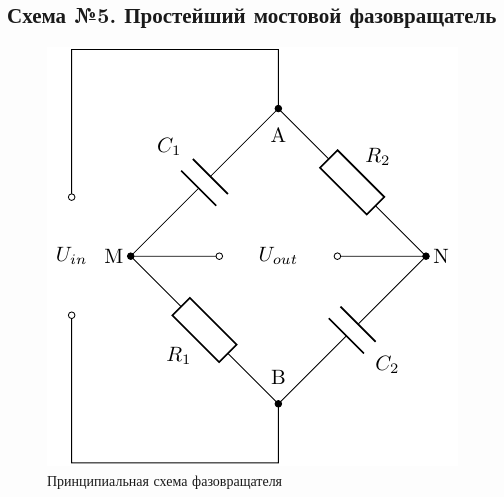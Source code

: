 \subsection{Схема №5. Простейший мостовой фазовращатель}

\begin{figure}[H]
	\centering
	\includegraphics[]{chems/chem5}
	\caption{Принципиальная схема фазовращателя}
	\label{fig:ph_rot}
\end{figure}


